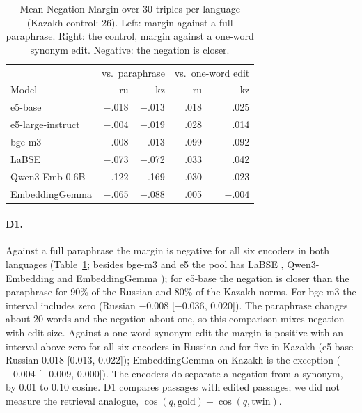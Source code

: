 \documentclass[11pt]{article}
\begin{document}
\begin{table}[t]
\centering\small\setlength{\tabcolsep}{4pt}
\begin{tabular}{lrrrr}
\toprule
& \multicolumn{2}{c}{vs.\ paraphrase} & \multicolumn{2}{c}{vs.\ one-word edit} \\
Model & ru & kz & ru & kz \\
\midrule
e5-base & $-$.018 & $-$.013 & .018 & .025 \\
e5-large-instruct & $-$.004 & $-$.019 & .028 & .014 \\
bge-m3 & $-$.008 & $-$.013 & .099 & .092 \\
LaBSE & $-$.073 & $-$.072 & .033 & .042 \\
Qwen3-Emb-0.6B & $-$.122 & $-$.169 & .030 & .023 \\
EmbeddingGemma & $-$.065 & $-$.088 & .005 & $-$.004 \\
\bottomrule
\end{tabular}
\caption{Mean Negation Margin over 30 triples per language (Kazakh control: 26). Left: margin against a full
paraphrase. Right: the control, margin against a one-word synonym edit. Negative: the negation is closer.}
\label{tab:d1}
\end{table}

\paragraph{D1.} Against a full paraphrase the margin is negative for all six encoders in both languages
(Table~\ref{tab:d1}; besides bge-m3 and e5 the pool has LaBSE \citep{feng-etal-2022-language}, Qwen3-Embedding
\citep{zhang2025qwen3} and EmbeddingGemma \citep{vera2025embeddinggemma}); for e5-base the negation is closer than the paraphrase for 90\% of the Russian and
80\% of the Kazakh norms. For bge-m3 the interval includes zero (Russian $-0.008$ [$-0.036$, $0.020$]). The
paraphrase changes about 20 words and the negation about one, so this comparison mixes negation with edit
size. Against a one-word synonym edit the margin is positive with an interval above zero for all six encoders
in Russian and for five in Kazakh (e5-base Russian $0.018$ [$0.013$, $0.022$]); EmbeddingGemma on Kazakh is the
exception ($-0.004$ [$-0.009$, $0.000$]). The encoders do separate a negation from a synonym, by 0.01 to 0.10
cosine. D1 compares passages with edited passages; we did not measure the retrieval analogue,
$\cos(q, \mathrm{gold}) - \cos(q, \mathrm{twin})$.
\end{document}
